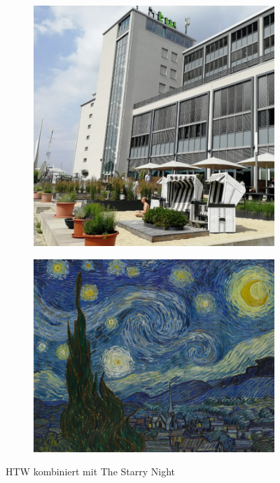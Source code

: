 \begin{figure}[H]
    \centering
    \begin{subfigure}[h]{0.20\textwidth}
        \centering
        \includegraphics[width=\textwidth]{resources/content/content/htw-768x768.jpg}
    \end{subfigure}
    \begin{subfigure}[h]{0.20\textwidth}
        \centering
        \includegraphics[width=\textwidth]{resources/content/style/starry_night.jpg}
    \end{subfigure}
    \caption{HTW kombiniert mit The Starry Night \cite{the_starry_night_img}}
\end{figure}

